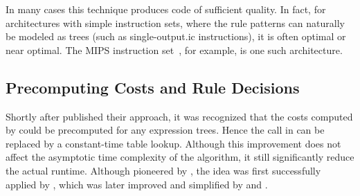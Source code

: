 In many cases this technique produces code of sufficient quality.
%
In fact, for architectures with simple \glspl{instruction set}, where the
\glspl{rule pattern} can naturally be modeled as trees (such as
\gls{single-output.ic} \glspl{instruction}), it is often optimal or near
optimal.
%
The \gls{MIPS} \gls{instruction set}~\cite{Sweetman:2006}, for example, is one
such architecture.


\subsection{Precomputing Costs and Rule Decisions}

Shortly after \citeauthor{AhoEtAl:1989} published their approach, it was
recognized that the costs computed by 
could be precomputed for any \glspl{expression tree}.
%
Hence the  call in
 can be replaced by a constant-time
table lookup.
%
Although this improvement does not affect the asymptotic time complexity of the
algorithm, it still significantly reduce the actual runtime.
%
Although pioneered by \textcite{HatcherChristopher:1986}, the idea was first
successfully applied by \textcite{Pelegri-LlopartGraham:1988}, which was later
improved and simplified by \textcite{BalachandranEtAl:1990} and
\textcite{Proebsting:1992:BURS}.

